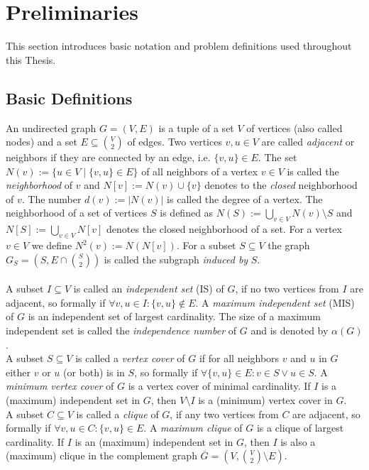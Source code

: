 \documentclass[]{article}
\begin{document}
\section{Preliminaries} \label{sec2}

This section introduces basic notation and problem definitions used throughout this Thesis.

\subsection{Basic Definitions}

An undirected graph $G=(V,E)$ is a tuple of a set $V$ of vertices (also called nodes) and a set $E\subseteq \binom{V}{2}$ of edges. Two vertices $v,u\in V$ are called \textit{adjacent} or neighbors if they are connected by an edge, i.e. $\{v,u\}\in E$. The set $N(v) := \{u \in V\;|\; \{v,u\}\in E \}$ of all neighbors of a vertex $v\in V$ is called the \textit{neighborhood} of $v$ and $N[v] := N(v) \cup \{v\}$ denotes to the \textit{closed} neighborhood of $v$. The number $d(v):=|N(v)|$ is called the degree of a vertex. The neighborhood of a set of vertices $S$ is defined as $N(S) := \bigcup_{v\in V}N(v)\setminus S$ and $N[S] := \bigcup_{v\in V}N[v]$ denotes the closed neighborhood of a set. For a vertex $v\in V$ we define $N^2(v) := N(N[v])$. For a subset $S\subseteq V$ the graph $G_S=(S, E\cap\binom{S}{2})$ is called the subgraph \textit{induced by} $S$.\paragraph{}
A subset $I\subseteq V$ is called an \emph{independent set} (IS) of $G$, if no two vertices from $I$ are adjacent, so formally if $\forall v,u\in I: \{v,u\}\notin E$. A \emph{maximum independent set} (MIS) of $G$ is an independent set of largest cardinality. The size of a maximum independent set is called the \emph{independence number} of $G$ and is denoted by $\alpha(G)$. \\
A subset $S\subseteq V$ is called a \emph{vertex cover} of $G$ if for all neighbors $v$ and $u$ in $G$ either $v$ or $u$ (or both) is in $S$, so formally if $\forall \{v,u\}\in E: v\in S \vee u\in S$. A \emph{minimum vertex cover} of $G$ is a vertex cover of minimal cardinality. If $I$ is a (maximum) independent set in $G$, then $V\setminus I$ is a (minimum) vertex cover in $G$.\\
A subset $C\subseteq V$ is called a \emph{clique} of $G$, if any two vertices from $C$ are adjacent, so formally if $\forall v,u\in C:\{v,u\}\in E$. A \emph{maximum clique} of $G$ is a clique of largest cardinality. If $I$ is an (maximum) independent set in $G$, then $I$ is also a (maximum) clique in the complement graph $\overline{G}=(V, \binom{V}{2}\setminus E)$.\paragraph{}
\end{document}
